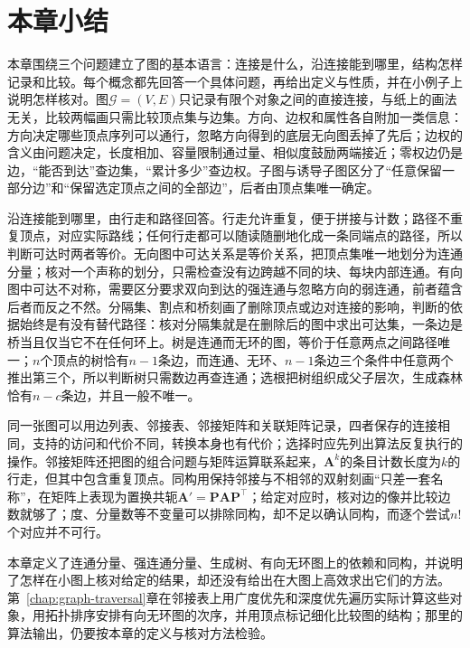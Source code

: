 \section{本章小结}
\label{sec:graph-objects-summary}

本章围绕三个问题建立了图的基本语言：连接是什么，沿连接能到哪里，结构怎样记录和比较。每个概念都先回答一个具体问题，再给出定义与性质，并在小例子上说明怎样核对。图$\mathcal G=(V,E)$只记录有限个对象之间的直接连接，与纸上的画法无关，比较两幅画只需比较顶点集与边集。方向、边权和属性各自附加一类信息：方向决定哪些顶点序列可以通行，忽略方向得到的底层无向图丢掉了先后；边权的含义由问题决定，长度相加、容量限制通过量、相似度鼓励两端接近；零权边仍是边，“能否到达”查边集，“累计多少”查边权。子图与诱导子图区分了“任意保留一部分边”和“保留选定顶点之间的全部边”，后者由顶点集唯一确定。

沿连接能到哪里，由行走和路径回答。行走允许重复，便于拼接与计数；路径不重复顶点，对应实际路线；任何行走都可以随读随删地化成一条同端点的路径，所以判断可达时两者等价。无向图中可达关系是等价关系，把顶点集唯一地划分为连通分量；核对一个声称的划分，只需检查没有边跨越不同的块、每块内部连通。有向图中可达不对称，需要区分要求双向到达的强连通与忽略方向的弱连通，前者蕴含后者而反之不然。分隔集、割点和桥刻画了删除顶点或边对连接的影响，判断的依据始终是有没有替代路径：核对分隔集就是在删除后的图中求出可达集，一条边是桥当且仅当它不在任何环上。树是连通而无环的图，等价于任意两点之间路径唯一；$n$个顶点的树恰有$n-1$条边，而连通、无环、$n-1$条边三个条件中任意两个推出第三个，所以判断树只需数边再查连通；选根把树组织成父子层次，生成森林恰有$n-c$条边，并且一般不唯一。

同一张图可以用边列表、邻接表、邻接矩阵和关联矩阵记录，四者保存的连接相同，支持的访问和代价不同，转换本身也有代价；选择时应先列出算法反复执行的操作。邻接矩阵还把图的组合问题与矩阵运算联系起来，$\bm A^k$的条目计数长度为$k$的行走，但其中包含重复顶点。同构用保持邻接与不相邻的双射刻画“只差一套名称”，在矩阵上表现为置换共轭$\bm A'=\bm P\bm A\bm P^{\top}$；给定对应时，核对边的像并比较边数就够了；度、分量数等不变量可以排除同构，却不足以确认同构，而逐个尝试$n!$个对应并不可行。

本章定义了连通分量、强连通分量、生成树、有向无环图上的依赖和同构，并说明了怎样在小图上核对给定的结果，却还没有给出在大图上高效求出它们的方法。第~\ref{chap:graph-traversal}章在邻接表上用广度优先和深度优先遍历实际计算这些对象，用拓扑排序安排有向无环图的次序，并用顶点标记细化比较图的结构；那里的算法输出，仍要按本章的定义与核对方法检验。
